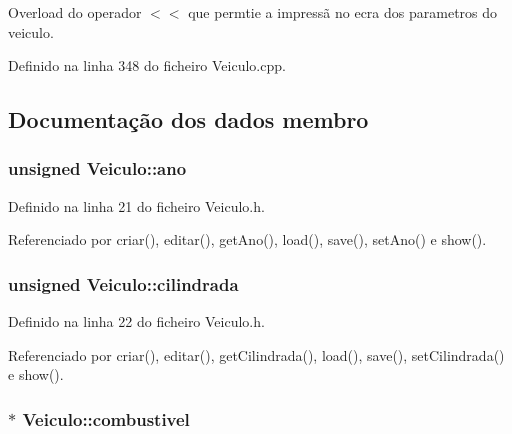 Overload do operador $<$$<$ que permtie a impressã no ecra dos parametros do veiculo. 



Definido na linha 348 do ficheiro Veiculo.\+cpp.



\subsection{Documentação dos dados membro}
\hypertarget{class_veiculo_ae141824a9353b3f7ed99d5c34c830fe2}{
\subsubsection[{ano}]{\setlength{\rightskip}{0pt plus 5cm}unsigned Veiculo\+::ano\hspace{0.3cm}{\ttfamily [private]}}}\label{class_veiculo_ae141824a9353b3f7ed99d5c34c830fe2}


Definido na linha 21 do ficheiro Veiculo.\+h.



Referenciado por criar(), editar(), get\+Ano(), load(), save(), set\+Ano() e show().

\hypertarget{class_veiculo_a3c3b3f2f958a98b48fa5e4f46007c9f9}{
\subsubsection[{cilindrada}]{\setlength{\rightskip}{0pt plus 5cm}unsigned Veiculo\+::cilindrada\hspace{0.3cm}{\ttfamily [private]}}}\label{class_veiculo_a3c3b3f2f958a98b48fa5e4f46007c9f9}


Definido na linha 22 do ficheiro Veiculo.\+h.



Referenciado por criar(), editar(), get\+Cilindrada(), load(), save(), set\+Cilindrada() e show().

\hypertarget{class_veiculo_ad8416cc9da449baed5e07ed146572712}{
\subsubsection[{combustivel}]{$\ast$ Veiculo\+::combustivel\hspace{0.3cm}{\ttfamily [private]}}}\label{class_veiculo_ad8416cc9da449baed5e07ed146572712}


